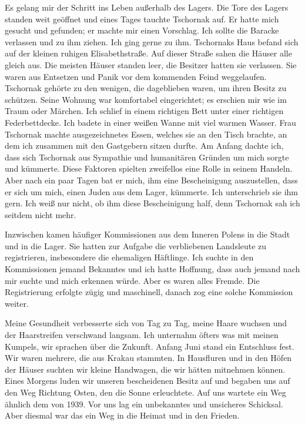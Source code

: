 Es gelang mir der Schritt ins Leben außerhalb des Lagers. Die Tore des Lagers standen weit geöffnet und eines Tages tauchte Tschornak auf. Er hatte mich gesucht und gefunden; er machte mir einen Vorschlag. Ich sollte die Baracke verlassen und zu ihm ziehen. Ich ging gerne zu ihm. Tschornaks Haus befand sich auf der kleinen ruhigen Elisabethstraße. Auf dieser Straße sahen die Häuser alle gleich aus. Die meisten Häuser standen leer, die Besitzer hatten sie verlassen. Sie waren aus Entsetzen und Panik vor dem kommenden Feind weggelaufen. Tschornak gehörte zu den wenigen, die dageblieben waren, um ihren Besitz zu schützen. Seine Wohnung war komfortabel eingerichtet; es erschien mir wie im Traum oder Märchen. Ich schlief in einem richtigen Bett unter einer richtigen Federbettdecke. Ich badete in einer weißen Wanne mit viel warmen Wasser. Frau Tschornak machte ausgezeichnetes Essen, welches sie an den Tisch brachte, an dem ich zusammen mit den Gastgebern sitzen durfte. Am Anfang dachte ich, dass sich Tschornak aus Sympathie und humanitären Gründen um mich sorgte und kümmerte. Diese Faktoren spielten zweifellos eine Rolle in seinem Handeln. Aber nach ein paar Tagen bat er mich, ihm eine Bescheinigung auszustellen, dass er sich um mich, einen Juden aus dem Lager, kümmerte. Ich unterschrieb sie ihm gern. Ich weiß nur nicht, ob ihm diese Bescheinigung half, denn Tschornak sah ich seitdem nicht mehr.

Inzwischen kamen häufiger Kommissionen aus dem Inneren Polens in die Stadt und in die Lager. Sie hatten zur Aufgabe die verbliebenen Landsleute zu registrieren, insbesondere die ehemaligen Häftlinge. Ich suchte in den Kommissionen jemand Bekanntes und ich hatte Hoffnung, dass auch jemand nach mir suchte und mich erkennen würde. Aber es waren alles Fremde. 
Die Registrierung erfolgte zügig und maschinell, danach zog eine solche Kommission weiter.

Meine Gesundheit verbesserte sich von Tag zu Tag, meine Haare wuchsen und der Haarstreifen verschwand langsam. Ich unternahm öfters was mit meinen Kumpels, wir sprachen über die Zukunft. Anfang Juni stand ein Entschluss fest. Wir waren mehrere, die aus Krakau stammten. In Hausfluren und in den Höfen der Häuser suchten wir kleine Handwagen, die wir hätten mitnehmen können. Eines Morgens luden wir unseren bescheidenen Besitz auf und begaben uns auf den Weg Richtung Osten, den die Sonne erleuchtete. Auf uns wartete ein Weg ähnlich dem von 1939. Vor uns lag ein unbekanntes und unsicheres Schicksal. Aber diesmal war das ein Weg in die Heimat und in den Frieden.~


